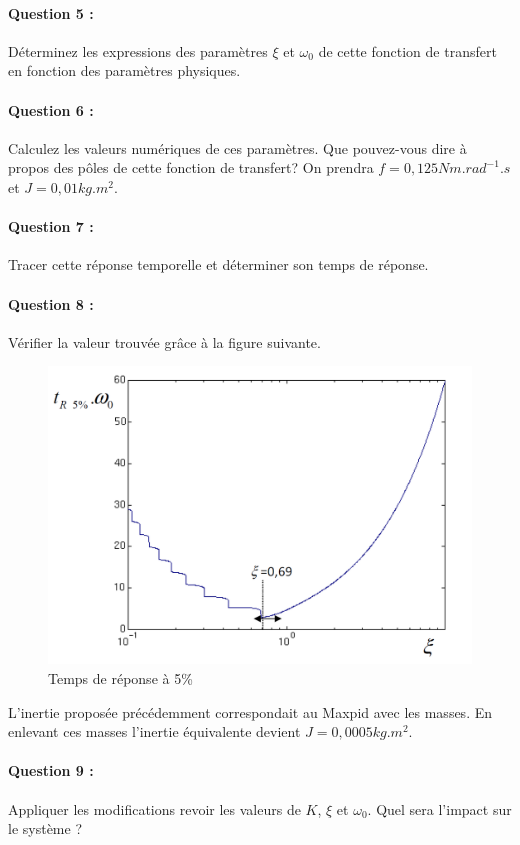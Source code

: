 \paragraph{Question 5 :} Déterminez les expressions des paramètres $\xi$ et $\omega_0$ de cette fonction de transfert en fonction des paramètres physiques.

\paragraph{Question 6 :} Calculez les valeurs numériques de ces paramètres. Que pouvez-vous dire à propos des pôles de cette fonction de transfert? On prendra $f=0,125Nm.rad^{-1}.s$ et $J=0,01kg.m^2$.

\paragraph{Question 7 :} Tracer cette réponse temporelle et déterminer son temps de réponse.


\paragraph{Question 8 :} Vérifier la valeur trouvée grâce à la figure suivante.

\begin{figure}[!h]
 \centering\includegraphics[width=0.7\linewidth]{img/maxpid4.png}
 \caption{Temps de réponse à 5\%}
 \label{maxpid4}
\end{figure}
\newpage

L'inertie proposée précédemment correspondait au Maxpid avec les masses. En enlevant ces masses l'inertie équivalente devient $J=0,0005kg.m^2$.

\paragraph{Question 9 :} Appliquer les modifications revoir les valeurs de $K$, $\xi$ et $\omega_0$. Quel sera l'impact sur le système ?

